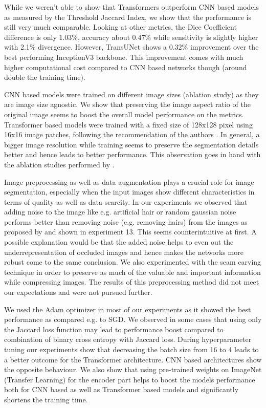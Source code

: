 \par
While we weren’t able to show that Transformers outperform CNN based models as measured by the Threshold Jaccard Index, we show that the performance is still very much comparable. Looking at other metrics, the Dice Coefficient difference is only 1.03\%, accuracy about 0.47\% while sensitivity is slightly higher with 2.1\% divergence. However, TransUNet shows a 0.32\% improvement over the best performing InceptionV3 backbone. This improvement comes with much higher computational cost compared to CNN based networks though (around double the training time).

\par
CNN based models were trained on different image sizes (ablation study) as they are image size agnostic. We show that preserving the image aspect ratio of the original image seems to boost the overall model performance on the metrics. Transformer based models were trained with a fixed size of 128x128 pixel using 16x16 image patches, following the recommendation of the authors \citep{transunet-2021-chen, medical_transformer-2021-valanarasu}. In general, a bigger image resolution while training seems to preserve the segmentation details better and hence leads to better performance. This observation goes in hand with the ablation studies performed by \citep{transunet-2021-chen}.

\par
Image preprocessing as well as data augmentation plays a crucial role for image segmentation, especially when the input images show different characteristics in terms of quality as well as data scarcity. In our experiments we observed that adding noise to the image like e.g. artificial hair or random gaussian noise performs better than removing noise (e.g. removing hairs) from the images as proposed by \citep{data_purification-2019-bisla} and shown in experiment 13. This seems counterintuitive at first. A possible explanation would be that the added noise helps to even out the underrepresentation of occluded images and hence makes the networks more robust \citep{skin_segmentation-2019-jahanifar} come to the same conclusion. We also experimented with the seam carving technique \citep{seam_carving-2007-shai} in order to preserve as much of the valuable and important information while compressing images. The results of this preprocessing method did not meet our expectations and were not pursued further.

\par
We used the Adam optimizer in most of our experiments as it showed the best performance as compared e.g. to SGD. We observed in some cases that using only the Jaccard loss function may lead to performance boost compared to combination of binary cross entropy with Jaccard loss. During hyperparameter tuning our experiments show that decreasing the batch size from 16 to 4 leads to a better outcome for the Transformer architecture. CNN based architectures show the opposite behaviour. We also show that using pre-trained weights on ImageNet (Transfer Learning) for the encoder part helps to boost the models performance both for CNN based as well as Transformer based models and significantly shortens the training time.


